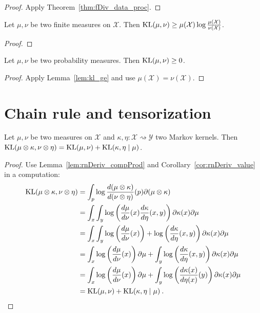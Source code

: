 \begin{proof}
Apply Theorem~\ref{thm:fDiv_data_proc}.
\end{proof}

\begin{lemma}
  \label{lem:kl_ge}
  \leanok
  Let $\mu, \nu$ be two finite measures on $\mathcal X$. Then $\mathrm{KL}(\mu, \nu) \ge \mu(\mathcal X) \log \frac{\mu(\mathcal X)}{\nu(\mathcal X)}$.
\end{lemma}

\begin{proof}\leanok
{}
\end{proof}

\begin{lemma}
  \label{lem:kl_nonneg}
  \leanok
  Let $\mu, \nu$ be two probability measures. Then $\mathrm{KL}(\mu, \nu) \ge 0$.
\end{lemma}

\begin{proof}\leanok
{}
Apply Lemma~\ref{lem:kl_ge} and use $\mu(\mathcal X) = \nu (\mathcal X)$.
\end{proof}

\section{Chain rule and tensorization}

\begin{theorem}
  \label{thm:kl_chain_rule}
  Let $\mu, \nu$ be two measures on $\mathcal X$ and $\kappa, \eta : \mathcal X \rightsquigarrow \mathcal Y$ two Markov kernels.
  Then $\mathrm{KL}(\mu \otimes \kappa, \nu \otimes \eta) = \mathrm{KL}(\mu, \nu) + \mathrm{KL}(\kappa, \eta \mid \mu)$.
\end{theorem}

\begin{proof}
Use Lemma~\ref{lem:rnDeriv_compProd} and Corollary~\ref{cor:rnDeriv_value} in a computation:
\begin{align*}
\mathrm{KL}(\mu \otimes \kappa, \nu \otimes \eta)
&= \int_p \log \frac{d(\mu \otimes \kappa)}{d(\nu \otimes \eta)}(p) \partial (\mu \otimes \kappa)
\\
&= \int_x \int_y\log \left(\frac{d\mu}{d \nu}(x)\frac{d\kappa}{d \eta}(x,y)\right) \partial \kappa(x) \partial\mu
\\
&= \int_x \int_y\log \left(\frac{d\mu}{d \nu}(x)\right) + \log \left(\frac{d\kappa}{d \eta}(x,y)\right) \partial \kappa(x) \partial\mu
\\
&= \int_x \log \left(\frac{d\mu}{d \nu}(x)\right)\partial\mu + \int_y\log \left(\frac{d\kappa}{d \eta}(x,y)\right) \partial \kappa(x) \partial\mu
\\
&= \int_x \log \left(\frac{d\mu}{d \nu}(x)\right)\partial\mu + \int_y\log \left(\frac{d\kappa(x)}{d \eta(x)}(y)\right) \partial \kappa(x) \partial\mu
\\
&= \mathrm{KL}(\mu, \nu) + \mathrm{KL}(\kappa, \eta \mid \mu)
\: .
\end{align*}

\end{proof}

